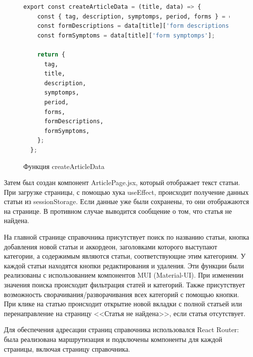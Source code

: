  \begin{figure}
 \begin{lstlisting}[language=Python]
export const createArticleData = (title, data) => {
    const { tag, description, symptomps, period, forms } = data[title];
    const formDescriptions = data[title]['form descriptions'];
    const formSymptoms = data[title]['form symptomps'];
  
    return {
      tag,
      title,
      description,
      symptomps,
      period,
      forms,
      formDescriptions,
      formSymptoms,
    };
  };
\end{lstlisting}
\caption{Функция createArticleData}
\label{src:src2}
\end{figure}

Затем был создан компонент ArticlePage.jsx, который отображает текст статьи. При загрузке страницы, с помощью хука useEffect, происходит получение данных статьи из sessionStorage. Если данные уже были сохранены, то они отображаются на странице. В противном случае выводится сообщение о том, что статья не найдена.

На главной странице справочника присутствует поиск по названию статьи, кнопка добавления новой статьи и аккордеон, заголовками которого выступают категории, а содержимым являются статьи, соответствующие этим категориям. У каждой статьи находятся кнопки редактирования и удаления. Эти функции были реализованы с использованием компонентов MUI (Material-UI). При изменении значения поиска происходит фильтрация статей и категорий. Также присутствует возможность сворачивания/разворачивания всех категорий с помощью кнопки. При клике на статью происходит открытие новой вкладки с полной статьей или перенаправление на страницу <<Статья не найдена>>, если статья отсутствует.

Для обеспечения адресации страниц справочника использовался React Router: была реализована маршрутизация и подключены компоненты для каждой страницы, включая страницу справочника.

